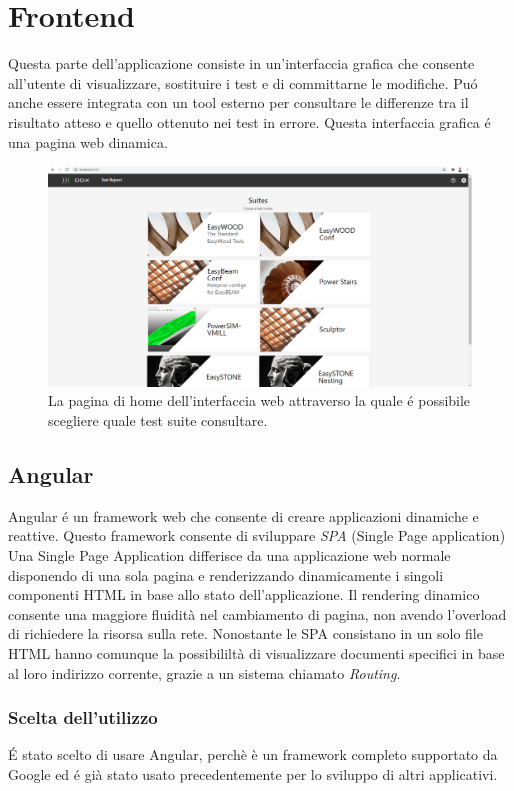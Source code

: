 \chapter{Frontend}
    Questa parte dell'applicazione consiste in un'interfaccia grafica che consente all'utente di visualizzare, sostituire i test e di committarne le modifiche.
    Pu\'o anche essere integrata con un tool esterno per consultare le differenze tra il risultato atteso e quello ottenuto nei test in errore.
    Questa interfaccia grafica \'e una pagina web dinamica.
    \begin{figure}
        \includegraphics[width=\textwidth]{images/homepage.png}
        \caption{La pagina di home dell'interfaccia web attraverso la quale \'e possibile scegliere quale test suite consultare.}
    \end{figure}
    \section{Angular}
        Angular \'e un framework web che consente di creare applicazioni dinamiche e reattive.    
        Questo framework consente di sviluppare \textit{SPA} (Single Page application)
        Una Single Page Application differisce da una applicazione web normale disponendo di una sola pagina e renderizzando dinamicamente i singoli componenti HTML in base allo stato dell'applicazione.
        Il rendering dinamico consente una maggiore fluidità nel cambiamento di pagina, non avendo l'overload di richiedere la risorsa sulla rete.
        Nonostante le SPA consistano in un solo file HTML hanno comunque la possibililtà di visualizzare documenti specifici in base al loro indirizzo corrente, grazie a un sistema chiamato \textit{Routing}. 
        \subsection{Scelta dell'utilizzo}
            \'E stato scelto di usare Angular, perchè è un framework completo supportato da Google
            ed \'e già stato usato precedentemente per lo sviluppo di altri applicativi.
            

